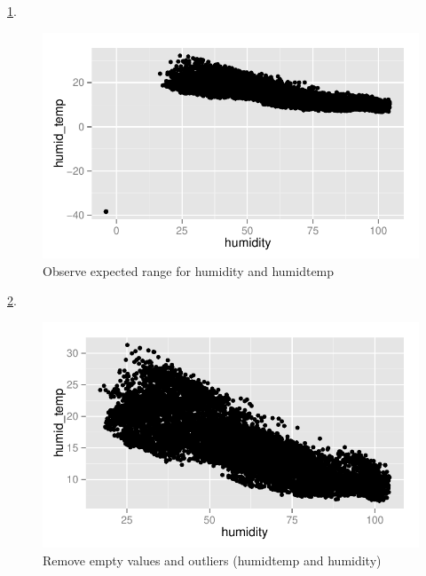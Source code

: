 \documentclass{article}\usepackage[]{graphicx}\usepackage[]{color}
\makeatletter
\def\maxwidth{ %
  \ifdim\Gin@nat@width>\linewidth
    \linewidth
  \else
    \Gin@nat@width
  \fi
}
\newenvironment{knitrout}{}{} %
\makeatother
\begin{document}
\ref{fig:plot_raw_humid_temp}.

\begin{knitrout}
\color{fgcolor}\begin{figure}[h!]


{\centering \includegraphics[width=\maxwidth]{figure/plot_raw_humid_temp} 

}

\caption[Observe expected range for humidity and humidtemp]{Observe expected range for humidity and humidtemp\label{fig:plot_raw_humid_temp}}
\end{figure}


\end{knitrout}

\ref{fig:plot_cleansed_humid_temp}.
\begin{knitrout}
\color{fgcolor}\begin{figure}[h!]


{\centering \includegraphics[width=\maxwidth]{figure/plot_cleansed_humid_temp} 

}

\caption[Remove empty values and outliers (humidtemp and humidity)]{Remove empty values and outliers (humidtemp and humidity)\label{fig:plot_cleansed_humid_temp}}
\end{figure}


\end{knitrout}
\end{document}
